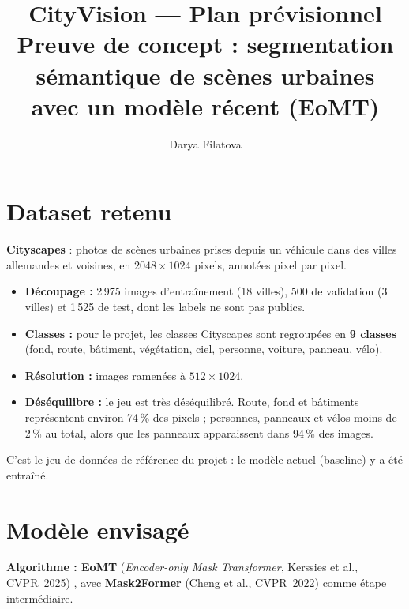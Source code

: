 \documentclass[11pt,a4paper]{article}
\title{\textbf{CityVision --- Plan prévisionnel}\\[2pt]
\large Preuve de concept : segmentation sémantique de scènes urbaines\\
avec un modèle récent (EoMT)}
\author{Darya Filatova}
\date{}
\begin{document}
\sloppy
\maketitle

\section*{Dataset retenu}

\textbf{Cityscapes} \cite{cordts2016} : photos de scènes urbaines prises depuis
un véhicule dans des villes allemandes et voisines, en $2048\times1024$ pixels,
annotées pixel par pixel.

\begin{itemize}
  \item \textbf{Découpage :} 2\,975 images d'entraînement (18 villes), 500 de
        validation (3 villes) et 1\,525 de test, dont les labels ne sont pas
        publics.
  \item \textbf{Classes :} pour le projet, les classes Cityscapes sont
        regroupées en \textbf{9 classes} (fond, route, bâtiment, végétation,
        ciel, personne, voiture, panneau, vélo).
  \item \textbf{Résolution :} images ramenées à $512\times1024$.
  \item \textbf{Déséquilibre :} le jeu est très déséquilibré. Route, fond et
        bâtiments représentent environ 74\,\% des pixels ; personnes, panneaux
        et vélos moins de 2\,\% au total, alors que les panneaux apparaissent
        dans 94\,\% des images.
\end{itemize}

C'est le jeu de données de référence du projet : le modèle actuel (baseline) y
a été entraîné.

\section*{Modèle envisagé}

\textbf{Algorithme : EoMT} (\emph{Encoder-only Mask Transformer},
Kerssies et al., CVPR~2025) \cite{kerssies2025vitsecretlyimagesegmentation},
avec \textbf{Mask2Former} (Cheng et al., CVPR~2022) \cite{cheng2022} comme étape
intermédiaire.
\end{document}
